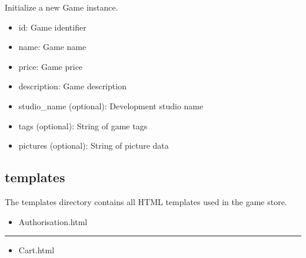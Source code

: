 \documentclass[letterpaper,10pt,english]{sphinxmanual}
\begin{document}
\begin{description}
\sphinxAtStartPar
Initialize a new Game instance.
\begin{description}
\begin{description}
\begin{itemize}
\item {} 
\sphinxAtStartPar
id: Game identifier

\item {} 
\sphinxAtStartPar
name: Game name

\item {} 
\sphinxAtStartPar
price: Game price

\item {} 
\sphinxAtStartPar
description: Game description

\item {} 
\sphinxAtStartPar
studio\_name (optional): Development studio name

\item {} 
\sphinxAtStartPar
tags (optional): String of game tags

\item {} 
\sphinxAtStartPar
pictures (optional): String of picture data

\end{itemize}

\end{description}

\end{description}

\end{description}


\subsection{templates}
\label{\detokenize{store-service:templates}}
\sphinxAtStartPar
The templates directory contains all HTML templates used in the game store.
\begin{itemize}
\item {} 
\sphinxAtStartPar
Authorisation.html

\end{itemize}


\bigskip\hrule\bigskip

\begin{itemize}
\item {} 
\sphinxAtStartPar
Cart.html

\end{itemize}
\end{document}
